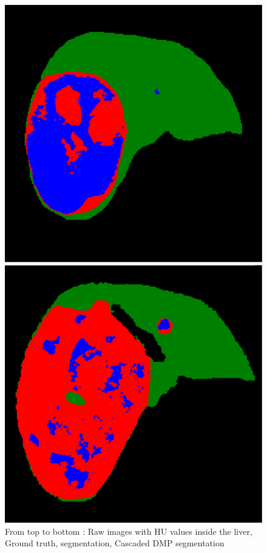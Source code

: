\begin{figure}[!ht]
\begin{minipage}{4cm}
\end{minipage} \hspace{-0.3cm}
\begin{minipage}{4cm}
\includegraphics[width=\linewidth]{../SemanticSeg/images/5_2_Cascade_resized}
\end{minipage} \hspace{-0.3cm}
\begin{minipage}{4cm}
\includegraphics[width=\linewidth]{../SemanticSeg/images/5_8_Cascade_resized}
\end{minipage} 
\caption{From top to bottom : Raw images with HU values inside the liver, Ground truth,  segmentation, Cascaded DMP segmentation}
\label{CompareFullCascade}
\end{figure}


